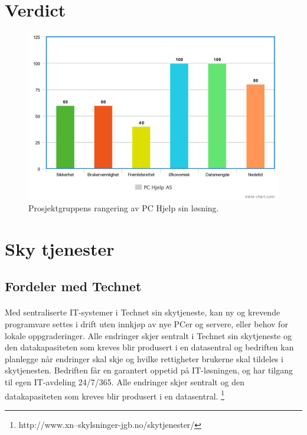 \section{Verdict}
\begin{figure}[H]
\centering
\includegraphics[width=6.5in]{Bilder/pchjelpchart.png}
\caption{Prosjektgruppens rangering av PC Hjelp sin løsning.}
\end{figure}

\section{Sky tjenester}

\subsection{Fordeler med Technet}
\paragraph{}Med sentraliserte IT-systemer i Technet sin skytjeneste, kan ny og krevende programvare settes i drift uten innkjøp av nye PCer og servere, eller behov for lokale oppgraderinger. Alle endringer skjer sentralt i Technet sin skytjeneste og den datakapasiteten som kreves blir produsert i en datasentral og bedriften kan planlegge når endringer skal skje og hvilke rettigheter brukerne skal tildeles i skytjenesten. Bedriften får en garantert oppetid på IT-løsningen, og har tilgang til egen IT-avdeling 24/7/365. Alle endringer skjer sentralt og den datakapasiteten som kreves blir produsert i en datasentral. 
\footnote{http://www.xn--skylsninger-jgb.no/skytjenester/}

